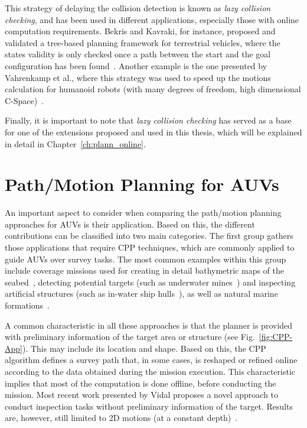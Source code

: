 This strategy of delaying the collision detection is known as \textit{lazy
collision checking}, and has been used in different applications, especially
those with online computation requirements. Bekris and Kavraki, for instance,
proposed and validated a tree-based planning framework for terrestrial vehicles,
where the states validity is only checked once a path between the start and the
goal configuration has been found~\cite{Bekris2007}. Another example is the one
presented by Vahrenkamp et al., where this strategy was used to speed up the
motions calculation for humanoid robots (with many degrees of freedom, \ie high
dimensional \ac{C-Space})~\cite{Vahrenkamp2007}.

Finally, it is important to note that \textit{lazy collision checking} has
served as a base for one of the extensions proposed and used in this thesis,
which will be explained in detail in Chapter~\ref{ch:plann_online}.

\section{Path/Motion Planning for AUVs}
\label{sec:StateOfTheArtPlannAUV}

An important aspect to consider when comparing the path/motion planning
approaches for \acp{AUV} is their application. Based on this, the different
contributions can be classified into two main categories. The first group
gathers those applications that require \acf{CPP} techniques, which are commonly
applied to guide \acp{AUV} over survey tasks. The most common examples within
this group include coverage missions used for creating in detail bathymetric
maps of the seabed~\cite{Fang2010, Galceran2012, Galceran2013b, Galceran2013d},
detecting potential targets (such as underwater mines~\cite{Stack2003,
Williams2010}) and inspecting artificial structures (such as in-water ship
hulls~\cite{Englot2010, Hover2012, Hollinger2013, Englot2013}), as well as
natural marine formations~\cite{Galceran2014,Galceran2014b}.

A common characteristic in all these approaches is that the planner is provided
with preliminary information of the target area or structure (see
Fig.~\ref{fig:CPP-App}). This may include its location and shape. Based on this,
the \ac{CPP} algorithm defines a survey path that, in some cases, is reshaped or
refined online according to the data obtained during the mission execution. This
characteristic implies that most of the computation is done offline, \ie before
conducting the mission. Most recent work presented by Vidal \etal proposes a
novel approach to conduct inspection tasks without preliminary information of
the target. Results are, however, still limited to \ac{2D} motions (at a
constant depth)~\cite{Vidal2017}.

